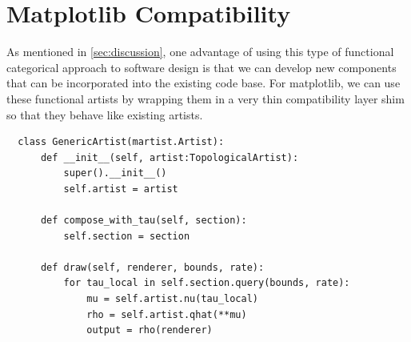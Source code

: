 \pagebreak
\section{Matplotlib Compatibility}
\label{sec:appendix:artist_shim}

As mentioned in \autoref{sec:discussion}, one advantage of using this type of
functional categorical approach to software design is that we can develop new
components that can be incorporated into the existing code base. For matplotlib,
we can use these functional artists by wrapping them in a very thin compatibility
layer shim so that they behave like existing artists.

\begin{verbatim}
  class GenericArtist(martist.Artist):
      def __init__(self, artist:TopologicalArtist):
          super().__init__()
          self.artist = artist

      def compose_with_tau(self, section):
          self.section = section

      def draw(self, renderer, bounds, rate):
          for tau_local in self.section.query(bounds, rate):
              mu = self.artist.nu(tau_local)
              rho = self.artist.qhat(**mu)
              output = rho(renderer)
  \end{verbatim}


